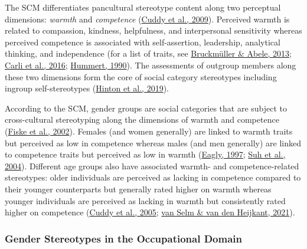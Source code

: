 \documentclass[
  12pt,
  letterpaper,
  DIV=11,
  numbers=noendperiod]{scrartcl}
\begin{document}
The SCM differentiates pancultural stereotype content along two
perceptual dimensions: \emph{warmth} and \emph{competence}
(\protect\hyperlink{ref-cuddy2009StereotypeContentModel}{Cuddy et al.,
2009}). Perceived warmth is related to compassion, kindness,
helpfulness, and interpersonal sensitivity whereas perceived competence
is associated with self-assertion, leadership, analytical thinking, and
independence (for a list of traits, see
\protect\hyperlink{ref-bruckmuller2013DensityBigTwo}{Bruckmüller \&
Abele, 2013}; \protect\hyperlink{ref-Carli2016}{Carli et al., 2016};
\protect\hyperlink{ref-hummert1990MultipleStereotypesElderly}{Hummert,
1990}). The assessments of outgroup members along these two dimensions
form the core of social category stereotypes including ingroup
self-stereotypes
(\protect\hyperlink{ref-hinton2019ExploringRelationshipGay}{Hinton et
al., 2019}).

According to the SCM, gender groups are social categories that are
subject to cross-cultural stereotyping along the dimensions of warmth
and competence (\protect\hyperlink{ref-fiske2002ModelOftenMixed}{Fiske
et al., 2002}). Females (and women generally) are linked to warmth
traits but perceived as low in competence whereas males (and men
generally) are linked to competence traits but perceived as low in
warmth (\protect\hyperlink{ref-Eagly1997}{Eagly, 1997};
\protect\hyperlink{ref-suh2004GenderRelationshipsInfluences}{Suh et al.,
2004}). Different age groups also have associated warmth- and
competence-related stereotypes: older individuals are perceived as
lacking in competence compared to their younger counterparts but
generally rated higher on warmth whereas younger individuals are
perceived as lacking in warmth but consistently rated higher on
competence (\protect\hyperlink{ref-cuddy2005ThisOldStereotype}{Cuddy et
al., 2005}; \protect\hyperlink{ref-vanselm2021SearchOlderWorker}{van
Selm \& van den Heijkant, 2021}).

\hypertarget{gender}{%
\subsubsection{Gender Stereotypes in the Occupational
Domain}\label{gender}}
\end{document}
